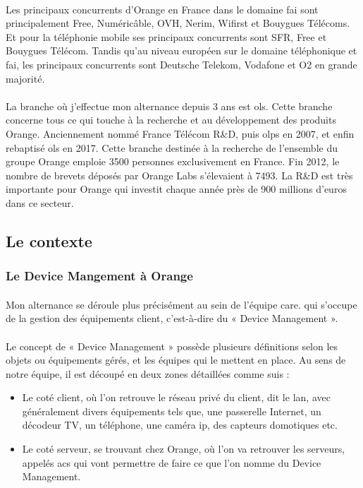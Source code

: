 \documentclass[12pt,a4paper]{report}
\begin{document}
\paragraph*{}
Les principaux concurrents d'Orange en France dans le domaine \gls{fai} sont principalement Free, Numéricâble, OVH, Nerim, Wifirst et Bouygues Télécoms. Et pour la téléphonie mobile ses principaux concurrents sont SFR, Free et Bouygues Télécom. Tandis qu'au niveau européen sur le domaine téléphonique et \gls{fai}, les principaux concurrents sont Deutsche Telekom, Vodafone et O2 en grande majorité.
\paragraph*{}
La branche où j’effectue mon alternance depuis 3 ans est \gls{ols}. Cette branche concerne tous ce qui touche à la recherche et au développement des produits Orange. Anciennement nommé France Télécom R\&D, puis \gls{olps} en 2007, et enfin rebaptisé \gls{ols} en 2017. Cette branche destinée à la recherche de l’ensemble du groupe Orange emploie 3500 personnes exclusivement en France. Fin 2012, le nombre de brevets déposés par Orange Labs s’élevaient à 7493. La R\&D est très importante pour Orange qui investit chaque année près de 900 millions d’euros dans ce secteur. \\

\subsection{Le contexte}
\subsubsection{Le Device Mangement à Orange}
\paragraph*{}
Mon alternance se déroule plus précisément au sein de l’équipe \gls{care}.  qui s’occupe de la gestion des équipements client, c’est-à-dire du « Device Management ».
\paragraph*{}
Le concept de « Device Management » possède plusieurs définitions selon les objets ou équipements gérés, et les équipes qui le mettent en place. Au sens de notre équipe, il est découpé en deux zones détaillées comme suis : 
\begin{itemize}
\subparagraph*{}
\item Le coté client, où l'on retrouve le réseau privé du client, dit le \gls{lan}, avec généralement divers équipements tels que, une passerelle Internet, un décodeur TV, un téléphone, une caméra \gls{ip}, des capteurs domotiques etc.
\item Le coté serveur, se trouvant chez Orange, où l'on va retrouver les serveurs, appelés \gls{acs} qui vont permettre de faire ce que l'on
nomme du Device Management.
\end{itemize}
\end{document}
